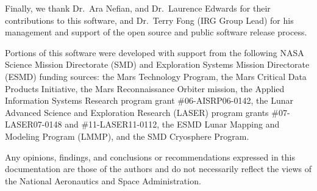 Finally, we thank Dr.~Ara Nefian, and Dr.~Laurence Edwards for their
contributions to this software, and Dr.~Terry Fong (IRG Group
Lead) for his management and support of the open source and public
software release process.

Portions of this software were developed with support from the
following NASA Science Mission Directorate (SMD) and Exploration
Systems Mission Directorate (ESMD) funding sources: the Mars
Technology Program, the Mars Critical Data Products Initiative, the
Mars Reconnaissance Orbiter mission, the Applied Information Systems
Research program grant \#06-AISRP06-0142, the Lunar Advanced Science
and Exploration Research (LASER) program grants \#07-LASER07-0148 and
\#11-LASER11-0112, the ESMD Lunar Mapping and Modeling Program (LMMP),
and the SMD Cryosphere Program.

Any opinions, findings, and conclusions or recommendations expressed
in this documentation are those of the authors and do not necessarily
reflect the views of the National Aeronautics and Space Administration.
